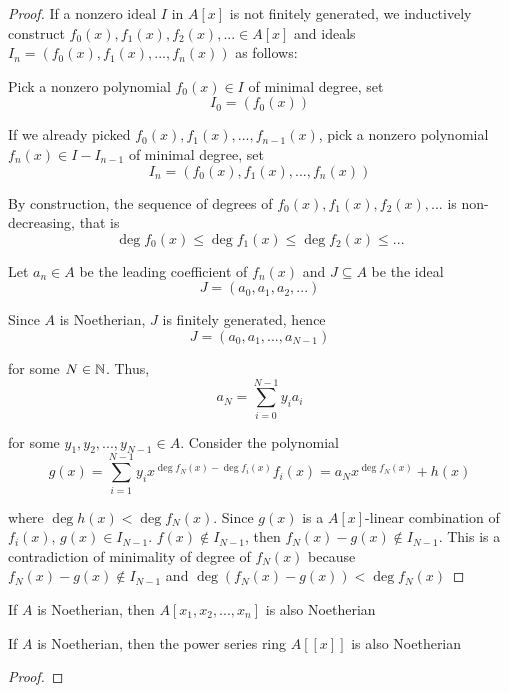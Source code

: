 \begin{proof}
	If a nonzero ideal $I$ in $A[x]$ is not finitely generated, we inductively construct $f_0(x), f_1(x), f_2(x), ... \in A[x]$ and ideals $I_n = (f_0(x), f_1(x), ..., f_n(x))$ as follows:
	
	Pick a nonzero polynomial $f_0(x) \in I$ of minimal degree, set
	$$
	I_0 = (f_0(x))
	$$
	
	If we already picked $f_0(x), f_1(x), ..., f_{n-1}(x)$, pick a nonzero polynomial $f_n(x) \in I - I_{n-1}$ of minimal degree, set
	$$
	I_n = (f_0(x), f_1(x), ..., f_n(x))
	$$
	
	By construction, the sequence of degrees of $f_0(x), f_1(x), f_2(x), ...$ is non-decreasing, that is
	$$
	\deg f_0(x) \leq \deg f_1(x) \leq \deg f_2(x) \leq ...
	$$
	
	Let $a_n \in A$ be the leading coefficient of $f_n(x)$ and $J \subseteq A$ be the ideal
	$$
	J = (a_0, a_1, a_2, ...)
	$$
	
	Since $A$ is Noetherian, $J$ is finitely generated, hence
	$$
	J = (a_0, a_1, ..., a_{N-1})
	$$
	
	for some $N \in \mathbb{N}$. Thus,
	$$
	a_N = \sum_{i=0}^{N-1} y_i a_i
	$$
	
	for some $y_1, y_2, ..., y_{N-1} \in A$. Consider the polynomial
	$$
	g(x) = \sum_{i=1}^{N-1} y_i x^{\deg f_N(x) - \deg f_i(x)} f_i(x) = a_N x^{\deg f_N(x)} + h(x)
	$$
	
	where $\deg h(x) < \deg f_N(x)$. Since $g(x)$ is a $A[x]$-linear combination of $f_i(x)$, $g(x) \in I_{N-1}$. $f(x) \notin I_{N-1}$, then $f_N(x) - g(x) \notin I_{N-1}$. This is a contradiction of minimality of degree of $f_N(x)$ because $f_N(x) - g(x) \notin I_{N-1}$ and $\deg(f_N(x) - g(x)) < \deg f_N(x)$
\end{proof}

\begin{corollary}
	If $A$ is Noetherian, then $A[x_1, x_2, ..., x_n]$ is also Noetherian
\end{corollary}

\begin{remark}
	If $A$ is Noetherian, then the power series ring $A[[x]]$ is also Noetherian
\end{remark}

\begin{proof}
\end{proof}

